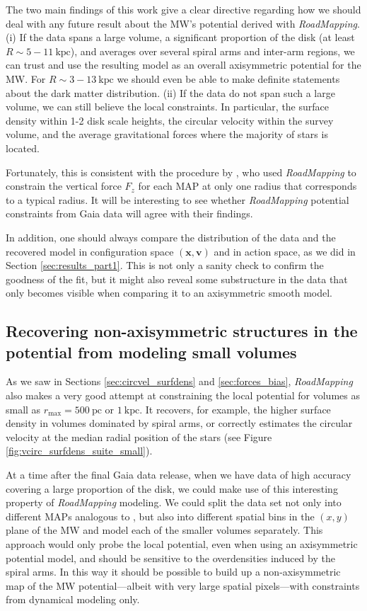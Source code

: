 \documentclass[iop,revtex4,numberedappendix,appendixfloats]{emulateapj}
\newcommand{\vect}[1]{\boldsymbol{#1}}
\newcommand{\RM}{{\sl RoadMapping}}
\begin{document}
The two main findings of this work give a clear directive regarding how we should deal with any future result about the MW's potential derived with \RM{}. (i) If the data spans a large volume, a significant proportion of the disk (at least $R\sim 5-11~\text{kpc}$), and averages over several spiral arms and inter-arm regions, we can trust and use the resulting model as an overall axisymmetric potential for the MW. For $R\sim 3-13~\text{kpc}$ we should even be able to make definite statements about the dark matter distribution. (ii) If the data do not span such a large volume, we can still believe the local constraints. In particular, the surface density within 1-2 disk scale heights, the circular velocity within the survey volume, and the average gravitational forces where the majority of stars is located.

Fortunately, this is consistent with the procedure by \citet{2013ApJ...779..115B}, who used \RM{} to constrain the vertical force $F_z$ for each MAP at only one radius that corresponds to a typical radius. It will be interesting to see whether \RM{} potential constraints from Gaia data will agree with their findings.

In addition, one should always compare the distribution of the data and the recovered model in configuration space $(\vect{x},\vect{v})$ and in action space, as we did in Section \ref{sec:results_part1}. This is not only a sanity check to confirm the goodness of the fit, but it might also reveal some substructure in the data that only becomes visible when comparing it to an axisymmetric smooth model.

\subsection{Recovering non-axisymmetric structures in the potential from modeling small volumes}

As we saw in Sections \ref{sec:circvel_surfdens} and \ref{sec:forces_bias}, \RM{} also makes a very good attempt at constraining the local potential for volumes as small as $r_\text{max}=500~\text{pc}$ or $1~\text{kpc}$. It recovers, for example, the higher surface density in volumes dominated by spiral arms, or correctly estimates the circular velocity at the median radial position of the stars (see Figure \ref{fig:vcirc_surfdens_suite_small}). 

At a time after the final Gaia data release, when we have data of high accuracy covering a large proportion of the disk, we could make use of this interesting property of \RM{} modeling. We could split the data set not only into different MAPs analogous to \citet{2013ApJ...779..115B}, but also into different spatial bins in the $(x,y)$ plane of the MW and model each of the smaller volumes separately. This approach would only probe the local potential, even when using an axisymmetric potential model, and should be sensitive to the overdensities induced by the spiral arms. In this way it should be possible to build up a non-axisymmetric map of the MW potential---albeit with very large spatial pixels---with constraints from dynamical modeling only.
\end{document}
